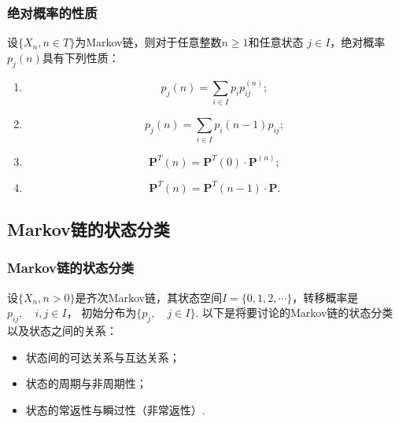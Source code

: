 \begin{frame}
    \frametitle{绝对概率的性质}

    \begin{mytheorem}[绝对概率的性质]
        设$\{X_n,n\in T\}$为Markov链，则对于任意整数$n\geqslant 1$和任意状态
        $j\in I$，绝对概率$p_j(n)$具有下列性质：
        \begin{enumerate}
            \item \begin{equation*}
                p_j(n)=\sum_{i\in I}p_i p_{ij}^{(n)};
            \end{equation*}
            \item \begin{equation*}
                p_j(n)=\sum_{i\in I}p_i(n-1)p_{ij};
            \end{equation*}
            \item \begin{equation*}
                \bm P^T(n)=\bm P^T(0)\cdot \bm P^{(n)};
            \end{equation*}
            \item \begin{equation*}
                \bm P^T(n)=\bm P^T(n-1)\cdot \bm P.
            \end{equation*}
        \end{enumerate}
    \end{mytheorem}
\end{frame}

\subsection{Markov链的状态分类}

\begin{frame}
    \frametitle{Markov链的状态分类}
    设$\{X_n,n>0\}$是齐次Markov链，其状态空间$I=\{0,1,2,\cdots\}$，转移概率是$p_{ij},\quad i,j\in I$，
    初始分布为$\{p_j,\quad j\in I\}$.
    以下是将要讨论的Markov链的状态分类以及状态之间的关系：
    \begin{itemize}
        \item 状态间的可达关系与互达关系；
        \item 状态的周期与非周期性；
        \item 状态的常返性与瞬过性（非常返性）. 
    \end{itemize}
\end{frame}

